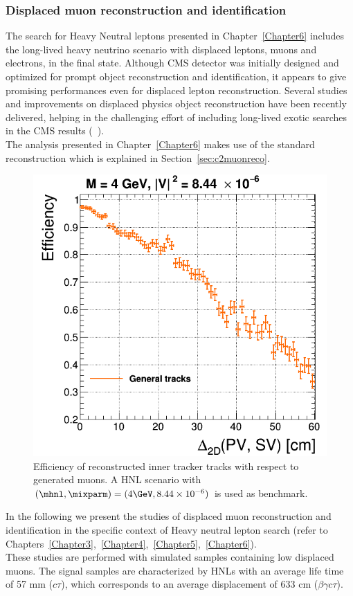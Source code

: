\subsubsection{Displaced muon
  reconstruction and identification}\label{sec:c2muondisplaced}
The search for Heavy Neutral leptons presented in
Chapter~\ref{Chapter6} includes the long-lived heavy
 neutrino scenario with
displaced leptons, muons and electrons, in the final
state. Although CMS detector was initially designed and optimized for prompt
object reconstruction and identification, it appears to give
promising performances even for displaced lepton
reconstruction. Several studies and improvements on displaced physics object
reconstruction have been recently
delivered, helping in the challenging effort of including long-lived
exotic searches in the CMS results (~\cite{cmscollaboration2021search, Sirunyan_2019ll,
  Sirunyan_2019ll2, Sirunyan_2020ll, Sirunyan_2021ll,CMS:2021tkn}).\\

The analysis presented in Chapter~\ref{Chapter6} makes use of the
standard reconstruction which
 is explained in
Section~\ref{sec:c2muonreco}.

\begin{figure}
\centering
\includegraphics[width=.40\textwidth]{Figures/c6/object/tracking_M-4_V-0p00290516780927_rho.png}
  \caption{Efficiency of reconstructed inner tracker tracks with
    respect to generated muons. A HNL scenario with
    $(\mhnl,\mixparm)=(4\GeV,8.44\times10^{-6})$ is used as
    benchmark. \dani}
  \label{fig:c2tracking}
\end{figure}
In the following we present the studies of displaced muon
reconstruction and identification in the specific context of Heavy
neutral lepton search (refer to
Chapters~\ref{Chapter3},~\ref{Chapter4},~\ref{Chapter5},~\ref{Chapter6}).\\
These studies are performed with simulated samples containing
 low \pt displaced muons. 
The signal samples are characterized by HNLs with an
average life time of 57 mm ($c\tau$), which corresponds to an average
displacement of 633 cm ($\beta \gamma c \tau$).

